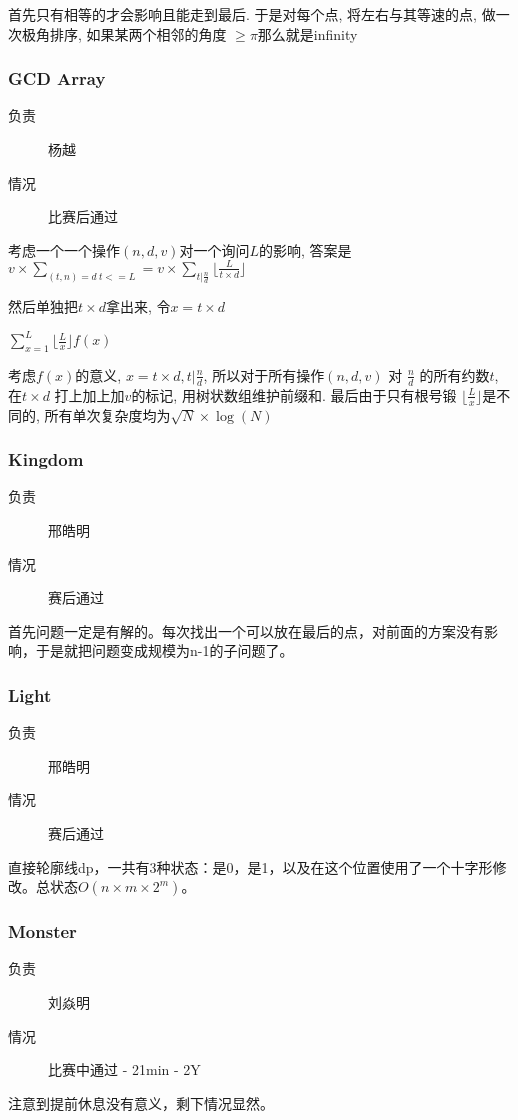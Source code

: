 \documentclass[a4paper, 11pt, nofonts, nocap, fancyhdr]{ctexart}
\newcommand{\problem}[1]{\subsubsection{#1}}
\begin{document}
首先只有相等的才会影响且能走到最后. 于是对每个点, 将左右与其等速的点, 做一次极角排序, 如果某两个相邻的角度 $\geq \pi$那么就是infinity

\problem{GCD Array}

\begin{description}
\item[负责] 杨越
\item[情况] 比赛后通过
\end{description}

考虑一个一个操作$(n, d, v)$对一个询问$L$的影响, 答案是$v\times \sum\limits_{(t,n)=d\ t<=L} = v\times \sum\limits_{t|\frac{n}{d}} \lfloor\frac{L}{t\times d}\rfloor$

然后单独把$t\times d$拿出来, 令$x = t\times d$

$\sum\limits_{x=1}^{L} \lfloor \frac{L}{x} \rfloor f(x)$

考虑$f(x)$的意义, $x=t\times d, t | \frac{n}{d}$, 所以对于所有操作$(n, d, v)$ 对 $\frac{n}{d}$ 的所有约数$t$, 在$t\times d$ 打上加上加$v$的标记, 用树状数组维护前缀和. 最后由于只有根号锻 $\lfloor\frac{L}{x}\rfloor$是不同的, 所有单次复杂度均为$\sqrt{N}\times \log(N)$

\problem{Kingdom}

\begin{description}
\item[负责] 邢皓明
\item[情况] 赛后通过
\end{description}

首先问题一定是有解的。每次找出一个可以放在最后的点，对前面的方案没有影响，于是就把问题变成规模为n-1的子问题了。

\problem{Light}

\begin{description}
\item[负责] 邢皓明
\item[情况] 赛后通过
\end{description}

直接轮廓线dp，一共有3种状态：是0，是1，以及在这个位置使用了一个十字形修改。总状态$O(n\times m\times 2^m)$。

\problem{Monster}

\begin{description}
\item[负责] 刘焱明
\item[情况] 比赛中通过 - 21min - 2Y
\end{description}

注意到提前休息没有意义，剩下情况显然。
\end{document}
